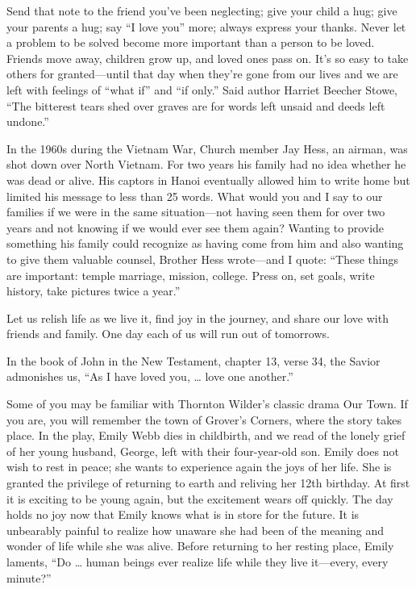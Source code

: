 \documentclass[letterpaper, 11pt]{report}
\begin{document}
Send that note to the friend you’ve been neglecting; give your child a hug; give your parents a hug; say “I love you” more; always express your thanks. Never let a problem to be solved become more important than a person to be loved. Friends move away, children grow up, and loved ones pass on. It’s so easy to take others for granted—until that day when they’re gone from our lives and we are left with feelings of “what if” and “if only.” Said author Harriet Beecher Stowe, “The bitterest tears shed over graves are for words left unsaid and deeds left undone.”

In the 1960s during the Vietnam War, Church member Jay Hess, an airman, was shot down over North Vietnam. For two years his family had no idea whether he was dead or alive. His captors in Hanoi eventually allowed him to write home but limited his message to less than 25 words. What would you and I say to our families if we were in the same situation—not having seen them for over two years and not knowing if we would ever see them again? Wanting to provide something his family could recognize as having come from him and also wanting to give them valuable counsel, Brother Hess wrote—and I quote: “These things are important: temple marriage, mission, college. Press on, set goals, write history, take pictures twice a year.”

Let us relish life as we live it, find joy in the journey, and share our love with friends and family. One day each of us will run out of tomorrows.

In the book of John in the New Testament, chapter 13, verse 34, the Savior admonishes us, “As I have loved you, … love one another.”

Some of you may be familiar with Thornton Wilder’s classic drama Our Town. If you are, you will remember the town of Grover’s Corners, where the story takes place. In the play, Emily Webb dies in childbirth, and we read of the lonely grief of her young husband, George, left with their four-year-old son. Emily does not wish to rest in peace; she wants to experience again the joys of her life. She is granted the privilege of returning to earth and reliving her 12th birthday. At first it is exciting to be young again, but the excitement wears off quickly. The day holds no joy now that Emily knows what is in store for the future. It is unbearably painful to realize how unaware she had been of the meaning and wonder of life while she was alive. Before returning to her resting place, Emily laments, “Do … human beings ever realize life while they live it—every, every minute?”
\end{document}
